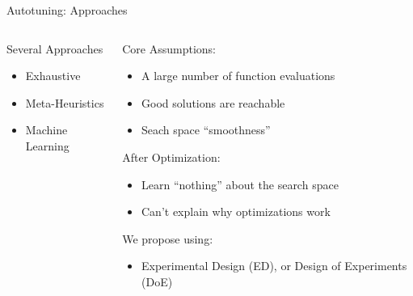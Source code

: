 \documentclass[10pt, compress, aspectratio=169, xcolor={table,usenames,dvipsnames}]{beamer}
\begin{document}
\begin{frame}[label={sec:org4403b71}]{Autotuning: Approaches}
\begin{columns}
\begin{column}{0.5\columnwidth}
\begin{block}{Several Approaches}
\footnotesize
\begin{itemize}
\item \colorbox{red!25}{Exhaustive}
\item \colorbox{green!25}{Meta-Heuristics}
\item \colorbox{cyan!25}{Machine Learning}
\end{itemize}
\normalsize

\vspace{-.4cm}


\end{block}
\end{column}

\begin{column}{0.5\columnwidth}
\begin{block}{Core Assumptions:}
\begin{itemize}
\item A large number of function evaluations
\item Good solutions are reachable
\item Seach space ``smoothness''
\end{itemize}
\begin{block}{After Optimization:}
\begin{itemize}
\item \alert{Learn ``nothing''} about the search space
\item \alert{Can't explain} why optimizations work
\end{itemize}
\end{block}
\begin{block}{We propose using:}
\begin{itemize}
\item \alert{Experimental Design} (\alert{ED}), or \alert{Design of Experiments} (\alert{DoE})
\end{itemize}
\end{block}
\end{block}
\end{column}
\end{columns}
\end{frame}
\end{document}
